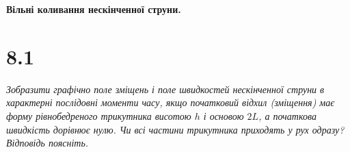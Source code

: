 


%


\textbf{\large Вільні коливання нескінченної струни.}

\section[Задача №8.1]{8.1}

\textit{Зобразити графічно поле зміщень і поле швидкостей нескінченної струни в характерні послідовні моменти часу, якщо початковий відхил (зміщення) має форму рівнобедреного трикутника висотою $h$ і основою $2L$, а початкова швидкість дорівнює нулю. Чи всі частини трикутника приходять у рух одразу? Відповідь поясніть.}


%